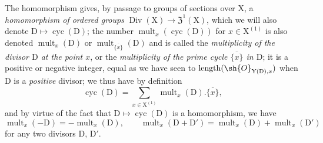 \begin{env}[21.6.7]
\label{IV.21.6.7}
The homomorphism  gives, by passage to groups of sections over $\mathrm{X}$, a \emph{homomorphism of ordered groups} $\operatorname{Div}(\mathrm{X})\to\mathfrak{Z}^1(\mathrm{X})$, which we will also denote $\mathrm{D}\mapsto\operatorname{cyc}(\mathrm{D})$;
the number $\operatorname{mult}_x(\operatorname{cyc}(\mathrm{D}))$ for $x\in\mathrm{X}^{(1)}$ is also denoted $\operatorname{mult}_x(\mathrm{D})$ or $\operatorname{mult}_{\overline{\{x\}}}(\mathrm{D})$ and is called the \emph{multiplicity of the divisor $\mathrm{D}$ at the point $x$}, or the \emph{multiplicity of the prime cycle $\overline{\{x\}}$ in $\mathrm{D}$};
it is a positive or negative integer, equal as we have seen to $\operatorname{length}(\sh{O}_{\mathrm{Y}(\mathrm{D}),x})$ when $\mathrm{D}$ is a \emph{positive} divisor;
we thus have by definition
\[
\label{IV.21.6.7.1}
  \operatorname{cyc}(\mathrm{D})=\sum_{x\in\mathrm{X}^{(1)}}\operatorname{mult}_x(\mathrm{D}).\overline{\{x\}},
  \tag{21.6.7.1}
\]
and by virtue of the fact that $\mathrm{D}\mapsto\operatorname{cyc}(\mathrm{D})$ is a homomorphism, we have
\[
\label{IV.21.6.7.2}
  \operatorname{mult}_x(-\mathrm{D})=-\operatorname{mult}_x(\mathrm{D}),\qquad\operatorname{mult}_x(\mathrm{D}+\mathrm{D}')=\operatorname{mult}_x(\mathrm{D})+\operatorname{mult}_x(\mathrm{D}')
  \tag{21.6.7.2}
\]
for any two divisors $\mathrm{D}$, $\mathrm{D}'$.


\end{env}

